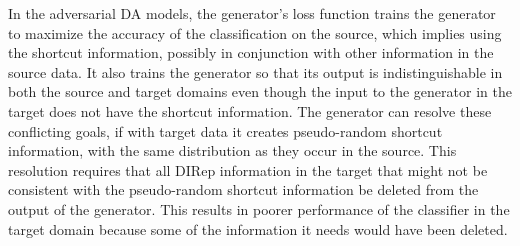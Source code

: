 \documentclass{article}
\newcommand{\elisa}[1]{\textbf{\color{red}Elisa: #1}}
\newcommand{\markw}[1]{\textbf{\color{green}Mark: #1}}
\newcommand{\adrian}[1]{\textbf{\color{blue}Adrian: #1}}
\begin{document}
In the adversarial DA models, the generator’s loss function trains the generator to maximize the accuracy of the classification on the source, which implies using the shortcut information, possibly in conjunction with other information in the source data.  It also trains the generator so that its output is indistinguishable in both the source and target domains even though the input to the generator in the target does not have the shortcut information.  The generator can resolve these conflicting goals, if with target data it creates pseudo-random shortcut information, with the same distribution as they occur in the source.  This resolution requires that all DIRep information in the target that might not be consistent with the pseudo-random shortcut information be deleted from the output of the generator.  This results in poorer performance of the classifier in the target domain because some of the information it needs would have been deleted.

\end{document}
